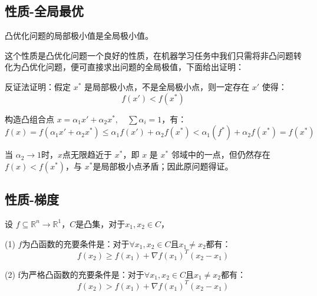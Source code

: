 \documentclass[12pt]{article}
\begin{document}
\subsection{性质-全局最优}
凸优化问题的局部极小值是全局极小值。

这个性质是凸优化问题一个良好的性质，在机器学习任务中我们只需将非凸问题转化为凸优化问题，便可直接求出问题的全局极值，下面给出证明：
\begin{framed}  
\small{
反证法证明：假定 $x^*$ 是局部极小点，不是全局极小点，则一定存在 $x'$ 使得：
$$
f(x') < f(x^*)
$$

构造凸组合点 $x = \alpha_1x' + \alpha_2x^*, \quad \sum\alpha_i = 1$，有：
$$
f(x) = f(\alpha_1x' + \alpha_2x^*) \le \alpha_1f(x') + \alpha_2f(x^*) < \alpha_1(f^*) + \alpha_2f(x^*) = f(x^*)
$$

当 $\alpha_2 \to 1$时，$x$点无限趋近于 $x^*$，即 $x$ 是 $x^*$ 邻域中的一点，但仍然存在 $f(x) < f(x^*)$，与 $x^*$是局部极小点矛盾；因此原问题得证。
}
\end{framed}

\subsection{性质-梯度}
设 $f \subseteq \mathbb{R}^n \to  \mathbb{R}^1$，$C$是凸集，对于$x_1, x_2 \in C$，

(1) $f$为凸函数的充要条件是：对于$\forall x_1, x_2 \in C$且$x_1 \neq x_2$都有：
$$
f(x_2) \ge f(x_1) + \nabla f(x_1)^T(x_2-x_1)
$$

(2) f为严格凸函数的充要条件是：对于$\forall x_1, x_2 \in C$且$x_1 \neq x_2$都有：
$$
f(x_2) > f(x_1) + \nabla f(x_1)^T(x_2-x_1)
$$
\end{document}
